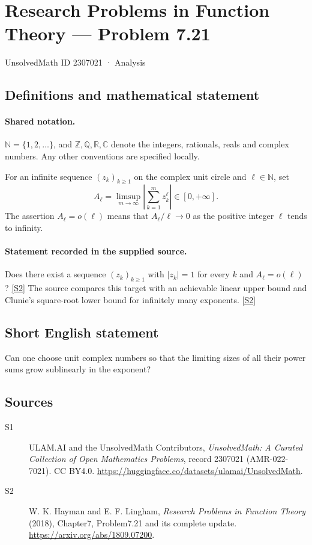 \documentclass[11pt]{article}
\newcommand{\sref}[2]{\hyperlink{source:#1:#2}{[S#2]}}
\begin{document}
\setcounter{section}{2307020}
\section{Research Problems in Function Theory — Problem 7.21}\label{2307021}
{\small\sffamily UnsolvedMath ID 2307021 · Analysis}
\subsection{Definitions and mathematical statement}

\paragraph{Shared notation.}$\mathbb N=\{1,2,\ldots\}$, and $\mathbb Z,\mathbb Q,\mathbb R,\mathbb C$ denote the integers, rationals, reals and complex numbers. Any other conventions are specified locally.


For an infinite sequence $(z_k)_{k\ge1}$ on the complex unit circle and $\ell\in\mathbb N$, set
\[A_\ell=\limsup_{m\to\infty}\left|\sum_{k=1}^m z_k^\ell\right|\in[0,+\infty].\]
The assertion $A_\ell=o(\ell)$ means that $A_\ell/\ell\to0$ as the positive integer $\ell$ tends to infinity.

\paragraph{Statement recorded in the supplied source.}
Does there exist a sequence $(z_k)_{k\ge1}$ with $|z_k|=1$ for every $k$ and $A_\ell=o(\ell)$? \sref{2307021}{2}
The source compares this target with an achievable linear upper bound and Clunie's square-root lower bound for infinitely many exponents. \sref{2307021}{2}
\subsection{Short English statement}
Can one choose unit complex numbers so that the limiting sizes of all their power sums grow sublinearly in the exponent?
\subsection{Sources}
\begin{description}
\item[\hypertarget{source:2307021:1}{S1}] ULAM.AI and the UnsolvedMath Contributors, \emph{UnsolvedMath: A Curated Collection of Open Mathematics Problems}, record 2307021 (AMR-022-7021). CC BY4.0. \url{https://huggingface.co/datasets/ulamai/UnsolvedMath}.
\item[\hypertarget{source:2307021:2}{S2}] W. K. Hayman and E. F. Lingham, \emph{Research Problems in Function Theory} (2018), Chapter7, Problem7.21 and its complete update. \url{https://arxiv.org/abs/1809.07200}.
\end{description}
\label{end:2307021}
\end{document}
